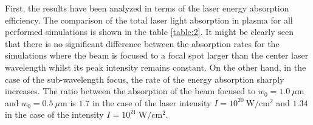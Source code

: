 First, the results have been analyzed in terms of the laser energy absorption efficiency. The comparison of the total laser light absorption in plasma for all performed simulations is shown in the table \ref{table:2}. It might be clearly seen that there is no significant difference between the absorption rates for the simulations where the beam is focused to a focal spot larger than the center laser wavelength whilst its peak intensity remains constant. On the other hand, in the case of the sub-wavelength focus, the rate of the energy absorption sharply increases. The ratio between the absorption of the beam focused to $ w_0 = 1.0 \ \mu\mathrm{m} $ and $ w_0 = 0.5 \ \mu\mathrm{m} $ is $ 1.7 $ in the case of the laser intensity $ I = 10^{20} \ \mathrm{W/cm^2} $ and $ 1.34 $ in the case of the intensity $ I = 10^{21} \ \mathrm{W/cm^2} $.

